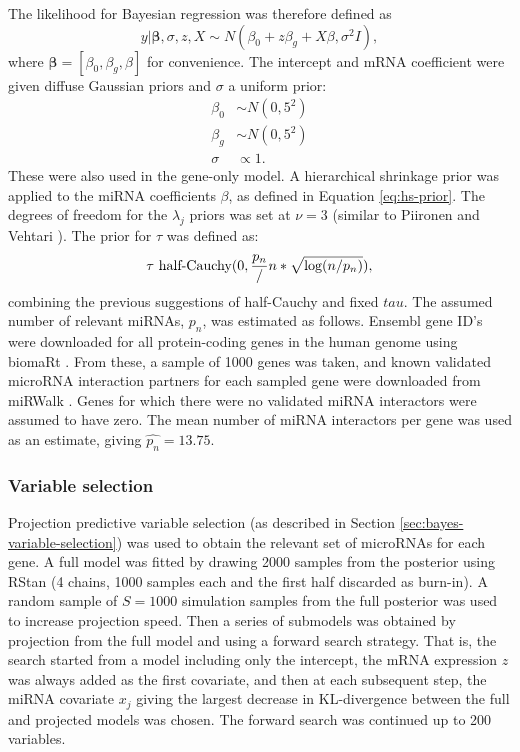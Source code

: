 The likelihood for Bayesian regression was therefore defined as
\begin{equation}
	y | \mathbf{\beta}, \sigma, z, X \sim N(\beta_0 + z \beta_g + X \beta, \sigma^2I),
\end{equation}
where $\mathbf{\beta} = [\beta_0, \beta_g, \beta]$ for convenience.
The intercept and mRNA coefficient were given diffuse Gaussian priors
and $\sigma$ a uniform prior:
\begin{subequations}
  \begin{align}
    \beta_0 & \sim N(0, 5^2) \\
    \beta_g & \sim N(0, 5^2) \\
    \sigma  & \propto 1.
  \end{align}
\end{subequations}
These were also used in the gene-only model.
A hierarchical shrinkage prior was applied to the miRNA coefficients $\beta$,
as defined in Equation \eqref{eq:hs-prior}. The degrees of freedom for the
$\lambda_j$ priors was set at $\nu=3$ (similar to Piironen and Vehtari
\citep{Piironen2015}). The prior for $\tau$ was defined as:
\begin{equation}
    \tau ~ \textup{half-Cauchy}(0, \frac{p_n}/{n}*\sqrt{\textup{log}(n/p_n)}),
\end{equation}
combining the previous suggestions of half-Cauchy and fixed $tau$.
The assumed number of relevant miRNAs, $p_n$, was estimated as follows.
Ensembl gene ID's were downloaded for all protein-coding genes in the human
genome using biomaRt \citep{biomaRt}. From these, a sample of 1000 genes was
taken, and known validated microRNA interaction partners for each sampled gene
were downloaded from miRWalk \citep{Dweep2015}. Genes for which there were no
validated miRNA interactors were assumed to have zero. The mean number of
miRNA interactors per gene was used as an estimate, giving
$\hat{p_n} = 13.75$.



\subsubsection{Variable selection}

Projection predictive variable selection (as described in Section
\ref{sec:bayes-variable-selection}) was used to obtain the relevant set
of microRNAs for each gene. A full model was fitted by drawing 2000 samples
from the posterior using RStan (4 chains, 1000 samples each and the first half
discarded as burn-in). A random sample of $S=1000$ simulation samples from the
full posterior was used to increase projection speed. Then a series of
submodels was obtained by projection from the full model and using a forward
search strategy. That is, the search started from a model including only the
intercept, the mRNA expression $z$ was always added as the first covariate,
and then at each subsequent step, the miRNA covariate $x_j$ giving the largest
decrease in KL-divergence between the full and projected models was chosen.
The forward search was continued up to 200 variables.

